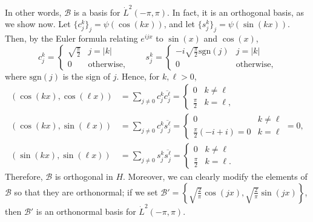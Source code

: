 \documentclass{homework}
\begin{document}
\begin{arabicparts}
		In other words, $\mathcal{B}$ is a basis for $\dot{L}^2(-\pi,\pi)$. In fact, it is an orthogonal basis, as we show now. Let $\{c^k_j\}_j = \psi(\cos(kx))$, and let $\{s^k_j\}_j = \psi(\sin(kx))$. Then, by the Euler formula relating $e^{ijx}$ to $\sin(x)$ and $\cos(x)$,
		\begin{equation}
			\label{eq:euler}
			c^k_j = \begin{cases}
				\sqrt{\frac{\pi}{2}} & j = |k| \\
				0 & \text{otherwise},
			\end{cases}\qquad
			s^k_j = \begin{cases}
				-i\sqrt{\frac{\pi}{2}}\mathrm{sgn}(j) & j = |k| \\
				0 & \text{otherwise},
			\end{cases}
		\end{equation}
		where $\mathrm{sgn}(j)$ is the sign of $j$. Hence, for $k, \ell > 0$,
		\begin{align}
			(\cos(kx), \cos(\ell x)) &= \sum_{j\ne0}c^k_j\overline{c^\ell_j} = \begin{cases}
				0 & k \ne \ell \\
				\frac{\pi}{2} & k = \ell,
			\end{cases}\\
			(\cos(kx), \sin(\ell x)) &= \sum_{j\ne0}c^k_j\overline{s^\ell_j} = \begin{cases}
				0 & k\ne \ell \\
				\frac{\pi}{2}\left(-i + i\right) = 0 & k = \ell
			\end{cases} = 0,\\
			(\sin(kx), \sin(\ell x)) &= \sum_{j\ne0}s^k_j\overline{s^\ell_j} = \begin{cases}
				0 & k\ne \ell \\
				\frac{\pi}{2} & k = \ell.
			\end{cases}
		\end{align}
		Therefore, $\mathcal{B}$ is orthogonal in $H$. Moreover, we can clearly modify the elements of $\mathcal{B}$ so that they are orthonormal; if we set $\mathcal{B}' = \left\{\sqrt{\frac{2}{\pi}}\cos(jx), \sqrt{\frac{2}{\pi}}\sin(jx)\right\}$, then $\mathcal{B}'$ is an orthonormal basis for $\dot{L}^2(-\pi,\pi)$.
		

\end{arabicparts}
\end{document}
